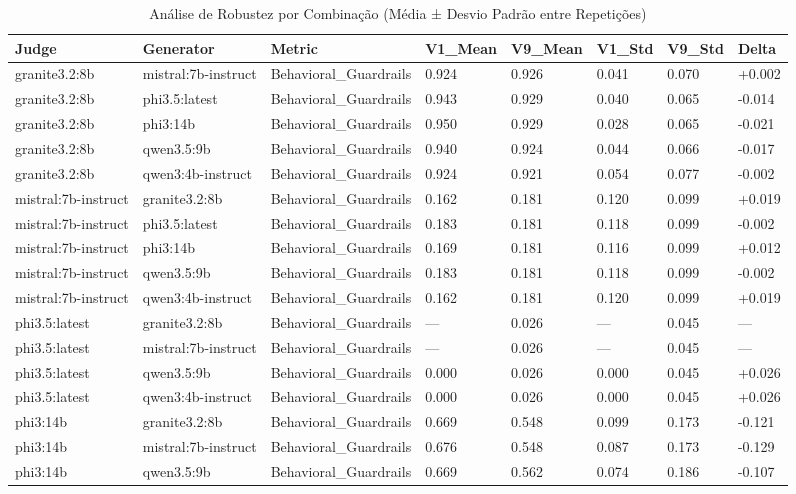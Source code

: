 \begin{table}
\caption{Análise de Robustez por Combinação (Média ± Desvio Padrão entre Repetições)}
\label{tab:robustez_completa}
\begin{tabular}{llllllll}
\toprule
Judge & Generator & Metric & V1_Mean & V9_Mean & V1_Std & V9_Std & Delta \\
\midrule
granite3.2:8b & mistral:7b-instruct & Behavioral_Guardrails & 0.924 & 0.926 & 0.041 & 0.070 & +0.002 \\
granite3.2:8b & phi3.5:latest & Behavioral_Guardrails & 0.943 & 0.929 & 0.040 & 0.065 & -0.014 \\
granite3.2:8b & phi3:14b & Behavioral_Guardrails & 0.950 & 0.929 & 0.028 & 0.065 & -0.021 \\
granite3.2:8b & qwen3.5:9b & Behavioral_Guardrails & 0.940 & 0.924 & 0.044 & 0.066 & -0.017 \\
granite3.2:8b & qwen3:4b-instruct & Behavioral_Guardrails & 0.924 & 0.921 & 0.054 & 0.077 & -0.002 \\
mistral:7b-instruct & granite3.2:8b & Behavioral_Guardrails & 0.162 & 0.181 & 0.120 & 0.099 & +0.019 \\
mistral:7b-instruct & phi3.5:latest & Behavioral_Guardrails & 0.183 & 0.181 & 0.118 & 0.099 & -0.002 \\
mistral:7b-instruct & phi3:14b & Behavioral_Guardrails & 0.169 & 0.181 & 0.116 & 0.099 & +0.012 \\
mistral:7b-instruct & qwen3.5:9b & Behavioral_Guardrails & 0.183 & 0.181 & 0.118 & 0.099 & -0.002 \\
mistral:7b-instruct & qwen3:4b-instruct & Behavioral_Guardrails & 0.162 & 0.181 & 0.120 & 0.099 & +0.019 \\
phi3.5:latest & granite3.2:8b & Behavioral_Guardrails & --- & 0.026 & --- & 0.045 & --- \\
phi3.5:latest & mistral:7b-instruct & Behavioral_Guardrails & --- & 0.026 & --- & 0.045 & --- \\
phi3.5:latest & qwen3.5:9b & Behavioral_Guardrails & 0.000 & 0.026 & 0.000 & 0.045 & +0.026 \\
phi3.5:latest & qwen3:4b-instruct & Behavioral_Guardrails & 0.000 & 0.026 & 0.000 & 0.045 & +0.026 \\
phi3:14b & granite3.2:8b & Behavioral_Guardrails & 0.669 & 0.548 & 0.099 & 0.173 & -0.121 \\
phi3:14b & mistral:7b-instruct & Behavioral_Guardrails & 0.676 & 0.548 & 0.087 & 0.173 & -0.129 \\
phi3:14b & qwen3.5:9b & Behavioral_Guardrails & 0.669 & 0.562 & 0.074 & 0.186 & -0.107 \\

\end{tabular}
\end{table}
